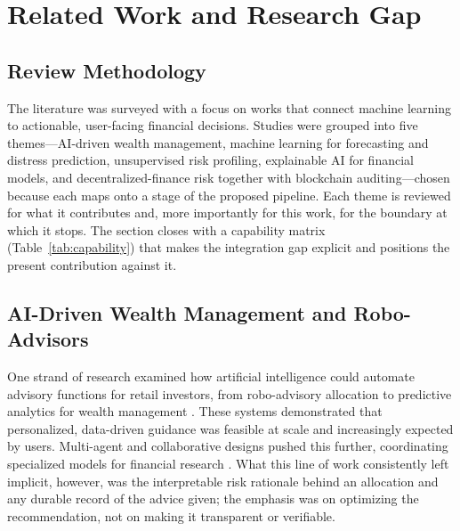 \section{Related Work and Research Gap}\label{sec:related}

\subsection{Review Methodology}\label{subsec:review-method}
The literature was surveyed with a focus on works that connect machine learning to
actionable, user-facing financial decisions. Studies were grouped into five
themes---AI-driven wealth management, machine learning for forecasting and distress
prediction, unsupervised risk profiling, explainable AI for financial models, and
decentralized-finance risk together with blockchain auditing---chosen because each maps
onto a stage of the proposed pipeline. Each theme is reviewed for what it contributes
and, more importantly for this work, for the boundary at which it stops. The section
closes with a capability matrix (Table~\ref{tab:capability}) that makes the integration
gap explicit and positions the present contribution against it.

\subsection{AI-Driven Wealth Management and Robo-Advisors}\label{subsec:wealth}
One strand of research examined how artificial intelligence could automate advisory
functions for retail investors, from robo-advisory allocation to predictive analytics
for wealth management \cite{ref1,ref2,ref8}. These systems demonstrated that
personalized, data-driven guidance was feasible at scale and increasingly expected by
users. Multi-agent and collaborative designs pushed this further, coordinating
specialized models for financial research \cite{ref9}. What this line of work
consistently left implicit, however, was the interpretable risk rationale behind an
allocation and any durable record of the advice given; the emphasis was on optimizing
the recommendation, not on making it transparent or verifiable.

